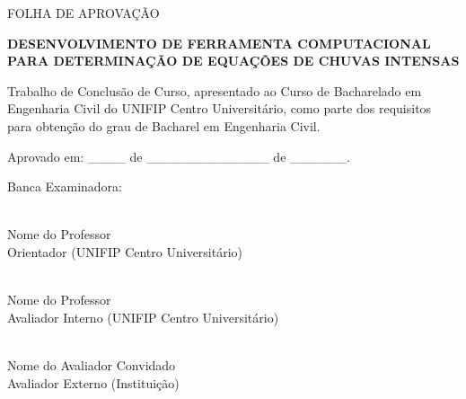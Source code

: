	\thispagestyle{empty}
	
	\begin{center}
		FOLHA DE APROVAÇÃO
	\end{center}
	
	\vspace{2cm}
	
	\begin{center}
	\textbf{DESENVOLVIMENTO DE FERRAMENTA COMPUTACIONAL PARA DETERMINAÇÃO DE EQUAÇÕES DE CHUVAS INTENSAS}
	\end{center}
	
	\vspace{1.5cm}
	\onehalfspacing
	\noindent Trabalho de Conclusão de Curso, apresentado ao Curso de Bacharelado em Engenharia Civil do UNIFIP Centro Universitário, como parte dos requisitos para obtenção do grau de Bacharel em Engenharia Civil.
	
	\vspace{10pt}
	
	\begin{center}
		Aprovado em: \_\_\_\_ de \_\_\_\_\_\_\_\_\_\_\_\_\_ de \_\_\_\_\_\_.
	\end{center}
	
	\vspace{10pt}
	
	\begin{center}
		Banca Examinadora:
	\end{center}
	
	\vspace{10pt}
	
	\begin{center}
		\hrulefill \\
		Nome do Professor\\
		Orientador (UNIFIP Centro Universitário)
	\end{center}
	
	\vspace{10pt}
	
	\begin{center}
		\hrulefill \\
		Nome do Professor \\
		Avaliador Interno (UNIFIP Centro Universitário)
	\end{center}
	
	\vspace{10pt}
	
	\begin{center}
		\hrulefill \\
		Nome do Avaliador Convidado\\
		Avaliador Externo (Instituição)
	\end{center}